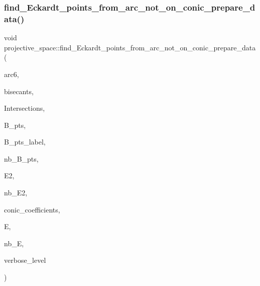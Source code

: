 \mbox{\label{classprojective__space_a0fc1d9c2df818d2ffa6750c2cb63c54c}} 
\subsubsection{\texorpdfstring{find\+\_\+\+Eckardt\+\_\+points\+\_\+from\+\_\+arc\+\_\+not\+\_\+on\+\_\+conic\+\_\+prepare\+\_\+data()}{find\_Eckardt\_points\_from\_arc\_not\_on\_conic\_prepare\_data()}}
{\footnotesize\ttfamily void projective\+\_\+space\+::find\+\_\+\+Eckardt\+\_\+points\+\_\+from\+\_\+arc\+\_\+not\+\_\+on\+\_\+conic\+\_\+prepare\+\_\+data (\begin{DoxyParamCaption}\item[{\mbox{\hyperlink{galois_8h_a09fddde158a3a20bd2dcadb609de11dc}{I\+NT}} $\ast$}]{arc6,  }\item[{\mbox{\hyperlink{galois_8h_a09fddde158a3a20bd2dcadb609de11dc}{I\+NT}} $\ast$\&}]{bisecants,  }\item[{\mbox{\hyperlink{galois_8h_a09fddde158a3a20bd2dcadb609de11dc}{I\+NT}} $\ast$\&}]{Intersections,  }\item[{\mbox{\hyperlink{galois_8h_a09fddde158a3a20bd2dcadb609de11dc}{I\+NT}} $\ast$\&}]{B\+\_\+pts,  }\item[{\mbox{\hyperlink{galois_8h_a09fddde158a3a20bd2dcadb609de11dc}{I\+NT}} $\ast$\&}]{B\+\_\+pts\+\_\+label,  }\item[{\mbox{\hyperlink{galois_8h_a09fddde158a3a20bd2dcadb609de11dc}{I\+NT}} \&}]{nb\+\_\+\+B\+\_\+pts,  }\item[{\mbox{\hyperlink{galois_8h_a09fddde158a3a20bd2dcadb609de11dc}{I\+NT}} $\ast$\&}]{E2,  }\item[{\mbox{\hyperlink{galois_8h_a09fddde158a3a20bd2dcadb609de11dc}{I\+NT}} \&}]{nb\+\_\+\+E2,  }\item[{\mbox{\hyperlink{galois_8h_a09fddde158a3a20bd2dcadb609de11dc}{I\+NT}} $\ast$\&}]{conic\+\_\+coefficients,  }\item[{\mbox{\hyperlink{classeckardt__point}{eckardt\+\_\+point}} $\ast$\&}]{E,  }\item[{\mbox{\hyperlink{galois_8h_a09fddde158a3a20bd2dcadb609de11dc}{I\+NT}} \&}]{nb\+\_\+E,  }\item[{\mbox{\hyperlink{galois_8h_a09fddde158a3a20bd2dcadb609de11dc}{I\+NT}}}]{verbose\+\_\+level }\end{DoxyParamCaption})}


